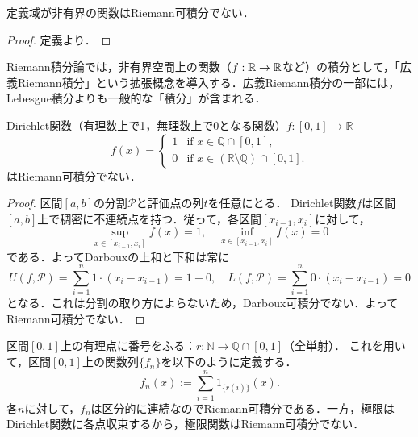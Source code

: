 \begin{example}
    定義域が非有界の関数はRiemann可積分でない．
\end{example}
\begin{proof}
    定義より．
\end{proof}
\begin{remark}
    Riemann積分論では，非有界空間上の関数（$f:\mathbb R \to \mathbb R$など）の積分として，「広義Riemann積分」という拡張概念を導入する．広義Riemann積分の一部には，Lebesgue積分よりも一般的な「積分」が含まれる．
\end{remark}

\begin{example}
    Dirichlet関数（有理数上で1，無理数上で0となる関数）$f:[0,1] \to \mathbb{R}$
    \[
    f(x) = \begin{cases}
        1 & \text{if } x \in \mathbb{Q} \cap [0,1], \\
        0 & \text{if } x \in (\mathbb{R} \setminus \mathbb{Q}) \cap [0,1].
    \end{cases}
    \]
    はRiemann可積分でない．
\end{example}
\begin{proof}
    区間$[a,b]$の分割$\mathcal{P}$と評価点の列$t$を任意にとる．
    Dirichlet関数$f$は区間$[a,b]$上で稠密に不連続点を持つ．従って，各区間$[x_{i-1}, x_i]$に対して，
    \[
    \sup_{x \in [x_{i-1}, x_i]} f(x) = 1, \quad \inf_{x \in [x_{i-1}, x_i]} f(x) = 0
    \]
    である．よってDarbouxの上和と下和は常に
    \[
    U(f,\mathcal{P}) = \sum_{i=1}^n 1 \cdot (x_i - x_{i-1}) = 1-0,
    \quad L(f,\mathcal{P}) = \sum_{i=1}^n 0 \cdot (x_i - x_{i-1}) = 0
    \]
    となる．これは分割の取り方によらないため，Darboux可積分でない．よってRiemann可積分でない．
\end{proof}

\begin{example}
    区間$[0,1]$上の有理点に番号をふる：$r : \mathbb{N} \to \mathbb{Q} \cap [0,1]$（全単射）．
    これを用いて，区間$[0,1]$上の関数列$\{f_n\}$を以下のように定義する．
    \[f_n(x) := \sum_{i=1}^n 1_{\{r(i)\}}(x).\]
    各$n$に対して，$f_n$は区分的に連続なのでRiemann可積分である．一方，極限はDirichlet関数に各点収束するから，極限関数はRiemann可積分でない．
\end{example}

